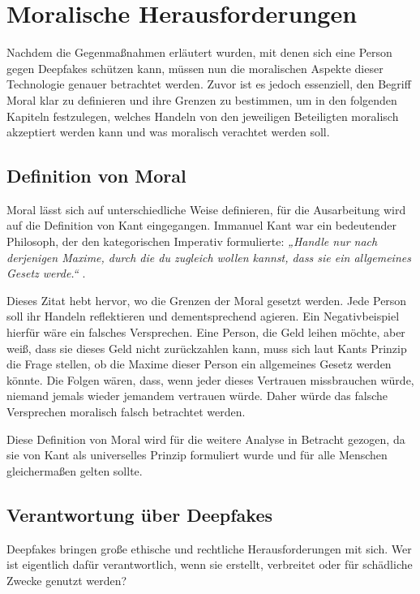 \documentclass[a4paper,12pt]{article}
\begin{document}
\newpage

\section{Moralische Herausforderungen}
Nachdem die Gegenmaßnahmen erläutert wurden, mit denen sich eine Person gegen Deepfakes schützen kann, müssen nun die moralischen Aspekte dieser Technologie genauer betrachtet werden. Zuvor ist es jedoch essenziell, den Begriff Moral klar zu definieren und ihre Grenzen zu bestimmen, um in den folgenden Kapiteln festzulegen, welches Handeln von den jeweiligen Beteiligten moralisch akzeptiert werden kann und was moralisch verachtet werden soll.

\subsection{Definition von Moral}
Moral lässt sich auf unterschiedliche Weise definieren, für die Ausarbeitung wird auf die Definition von Kant eingegangen. Immanuel Kant war ein bedeutender Philosoph, der den kategorischen Imperativ formulierte: \textit{„Handle nur nach derjenigen Maxime, durch die du zugleich wollen kannst, dass sie ein allgemeines Gesetz werde.“} \cite{KantMetaphysik}.

Dieses Zitat hebt hervor, wo die Grenzen der Moral gesetzt werden. Jede Person soll ihr Handeln reflektieren und dementsprechend agieren. Ein Negativbeispiel hierfür wäre ein falsches Versprechen. Eine Person, die Geld leihen möchte, aber weiß, dass sie dieses Geld nicht zurückzahlen kann, muss sich laut Kants Prinzip die Frage stellen, ob die Maxime dieser Person ein allgemeines Gesetz werden könnte. Die Folgen wären, dass, wenn jeder dieses Vertrauen missbrauchen würde, niemand jemals wieder jemandem vertrauen würde. Daher würde das falsche Versprechen moralisch falsch betrachtet werden. \cite{KantMetaphysik}

Diese Definition von Moral wird für die weitere Analyse in Betracht gezogen, da sie von Kant als universelles Prinzip formuliert wurde und für alle Menschen gleichermaßen gelten sollte.

\subsection{Verantwortung über Deepfakes}
Deepfakes bringen große ethische und rechtliche Herausforderungen mit sich. Wer ist eigentlich dafür verantwortlich, wenn sie erstellt, verbreitet oder für schädliche Zwecke genutzt werden?
\end{document}
